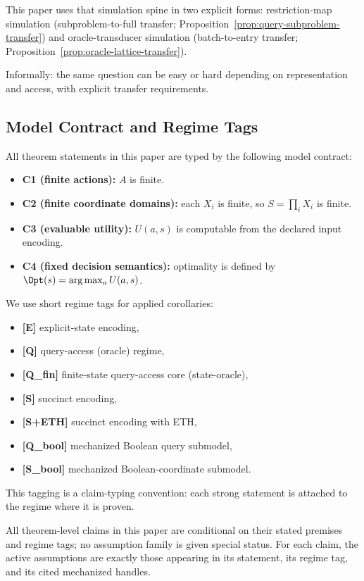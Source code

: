 This paper uses that simulation spine in two explicit forms: restriction-map simulation (subproblem-to-full transfer; Proposition~\ref{prop:query-subproblem-transfer}) and oracle-transducer simulation (batch-to-entry transfer; Proposition~\ref{prop:oracle-lattice-transfer}).

Informally: the same question can be easy or hard depending on representation and access, with explicit transfer requirements.

\subsection{Model Contract and Regime Tags}\label{sec:model-contract}

All theorem statements in this paper are typed by the following model contract:
\begin{itemize}
\item \textbf{C1 (finite actions):} $A$ is finite.
\item \textbf{C2 (finite coordinate domains):} each $X_i$ is finite, so $S=\prod_i X_i$ is finite.
\item \textbf{C3 (evaluable utility):} $U(a,s)$ is computable from the declared input encoding.
\item \textbf{C4 (fixed decision semantics):} optimality is defined by $\Opt(s)=\arg\max_a U(a,s)$.
\end{itemize}

We use short regime tags for applied corollaries:
\begin{itemize}
\item \textbf{[E]} explicit-state encoding,
\item \textbf{[Q]} query-access (oracle) regime,
\item \textbf{[Q\_fin]} finite-state query-access core (state-oracle),
\item \textbf{[S]} succinct encoding,
\item \textbf{[S+ETH]} succinct encoding with ETH,
\item \textbf{[Q\_bool]} mechanized Boolean query submodel,
\item \textbf{[S\_bool]} mechanized Boolean-coordinate submodel.
\end{itemize}

This tagging is a claim-typing convention: each strong statement is attached to the regime where it is proven.

\begin{remark}\label{rem:uniform-assumption-discipline}
All theorem-level claims in this paper are conditional on their stated premises and regime tags; no assumption family is given special status.
For each claim, the active assumptions are exactly those appearing in its statement, its regime tag, and its cited mechanized handles.
\end{remark}

